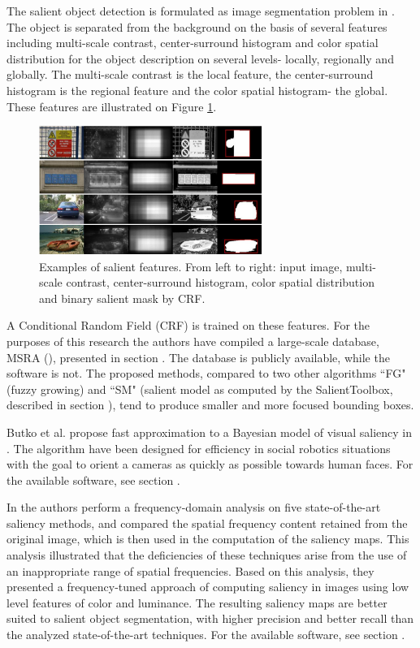 The salient object detection is formulated as image segmentation problem in \cite{LiuCVPR2007}. The object is separated from the background on the basis of several features including multi-scale contrast, center-surround histogram and color spatial distribution for the object description on several levels- locally, regionally and globally. The multi-scale contrast is the local feature, the center-surround histogram is the regional feature and the color spatial histogram- the global. These features are illustrated on Figure \ref{fig:sal_feat_liu07}.
\begin{figure}[H]
\begin{center}
\includegraphics[width=0.65\textwidth]{fig/SalientFeatures_Liu2007}
\end{center}
\caption{Examples of salient features. From left to right: input image, multi-scale contrast, center-surround histogram, color spatial distribution and binary salient mask by CRF.}
\label{fig:sal_feat_liu07}
\end{figure}
A Conditional Random Field (CRF) is trained on these features. 
For the purposes of this research the authors have compiled a large-scale database, MSRA (\cite{msra_db}), presented in section . The database is publicly available, while the software is not. The proposed methods, compared to two other algorithms ``FG" (fuzzy growing) and ``SM" (salient model as computed by the SalientToolbox, described in section ), tend to produce smaller and more focused bounding boxes.

Butko et al. propose fast approximation to a Bayesian model of visual saliency in \cite{ButkoZCM08}. The algorithm have been designed for efficiency in social robotics situations with the goal to orient a cameras as quickly as possible towards human faces. For the available software, see section .

In \cite{LCAV-CONF-2009-012} the authors perform a frequency-domain analysis on five state-of-the-art saliency methods, and compared the spatial frequency
content retained from the original image, which is then used in the computation of the saliency maps. This analysis illustrated that the deficiencies of these techniques
arise from the use of an inappropriate range of spatial frequencies. Based on this analysis, they presented a frequency-tuned
approach of computing saliency in images using low level features of color and luminance. The resulting saliency maps are better suited to salient object segmentation, with higher precision and better recall than the analyzed state-of-the-art techniques. For the available software, see section .

